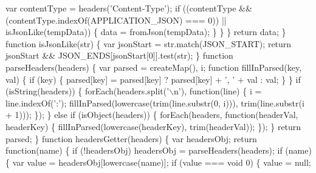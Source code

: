 \begin{DoxyCodeInclude}
{\textcolor{stringliteral}{      var contentType = headers('}Content-Type\textcolor{stringliteral}{');}
\textcolor{stringliteral}{      if ((contentType && (contentType.indexOf(APPLICATION\_JSON) === 0)) || isJsonLike(tempData)) \{}
\textcolor{stringliteral}{        data = fromJson(tempData);}
\textcolor{stringliteral}{      \}}
\textcolor{stringliteral}{    \}}
\textcolor{stringliteral}{  \}}
\textcolor{stringliteral}{}
\textcolor{stringliteral}{  return data;}
\textcolor{stringliteral}{\}}
\textcolor{stringliteral}{}
\textcolor{stringliteral}{function isJsonLike(str) \{}
\textcolor{stringliteral}{    var jsonStart = str.match(JSON\_START);}
\textcolor{stringliteral}{    return jsonStart && JSON\_ENDS[jsonStart[0]].test(str);}
\textcolor{stringliteral}{\}}
\textcolor{stringliteral}{}
\textcolor{stringliteral}{function parseHeaders(headers) \{}
\textcolor{stringliteral}{  var parsed = createMap(), i;}
\textcolor{stringliteral}{}
\textcolor{stringliteral}{  function fillInParsed(key, val) \{}
\textcolor{stringliteral}{    if (key) \{}
\textcolor{stringliteral}{      parsed[key] = parsed[key] ? parsed[key] + '}, \textcolor{stringliteral}{' + val : val;}
\textcolor{stringliteral}{    \}}
\textcolor{stringliteral}{  \}}
\textcolor{stringliteral}{}
\textcolor{stringliteral}{  if (isString(headers)) \{}
\textcolor{stringliteral}{    forEach(headers.split('}\(\backslash\)n\textcolor{stringliteral}{'), function(line) \{}
\textcolor{stringliteral}{      i = line.indexOf('}:\textcolor{stringliteral}{');}
\textcolor{stringliteral}{      fillInParsed(lowercase(trim(line.substr(0, i))), trim(line.substr(i + 1)));}
\textcolor{stringliteral}{    \});}
\textcolor{stringliteral}{  \} else if (isObject(headers)) \{}
\textcolor{stringliteral}{    forEach(headers, function(headerVal, headerKey) \{}
\textcolor{stringliteral}{      fillInParsed(lowercase(headerKey), trim(headerVal));}
\textcolor{stringliteral}{    \});}
\textcolor{stringliteral}{  \}}
\textcolor{stringliteral}{}
\textcolor{stringliteral}{  return parsed;}
\textcolor{stringliteral}{\}}
\textcolor{stringliteral}{}
\textcolor{stringliteral}{}
\textcolor{stringliteral}{function headersGetter(headers) \{}
\textcolor{stringliteral}{  var headersObj;}
\textcolor{stringliteral}{}
\textcolor{stringliteral}{  return function(name) \{}
\textcolor{stringliteral}{    if (!headersObj) headersObj =  parseHeaders(headers);}
\textcolor{stringliteral}{}
\textcolor{stringliteral}{    if (name) \{}
\textcolor{stringliteral}{      var value = headersObj[lowercase(name)];}
\textcolor{stringliteral}{      if (value === void 0) \{}
\textcolor{stringliteral}{        value = null;}
}
\end{DoxyCodeInclude}
